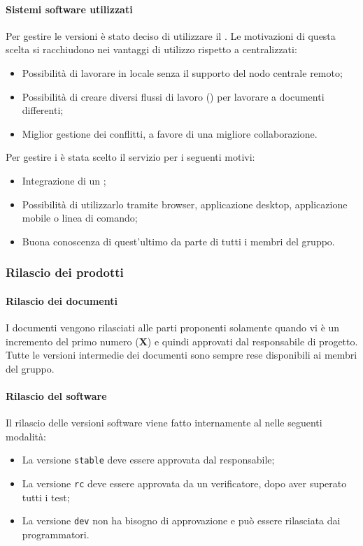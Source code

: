 \paragraph{Sistemi software utilizzati}
Per gestire le versioni è stato deciso di utilizzare il  . 
Le motivazioni di questa scelta si racchiudono nei vantaggi di utilizzo rispetto a  centralizzati:
\begin{itemize}
	\item Possibilità di lavorare in locale senza il supporto del nodo centrale remoto; 
	\item Possibilità di creare diversi flussi di lavoro () per lavorare a documenti differenti;
	\item Miglior gestione dei conflitti, a favore di una migliore collaborazione.
\end{itemize}
Per gestire i   è stata scelto il servizio  per i seguenti motivi: 
\begin{itemize}
	\item Integrazione di un ;
	\item Possibilità di utilizzarlo tramite browser, applicazione desktop, applicazione mobile o linea di comando;
	\item Buona conoscenza di quest'ultimo da parte di tutti i membri del gruppo.
\end{itemize}

\subsubsection{Rilascio dei prodotti}
\paragraph{Rilascio dei documenti}
I documenti vengono rilasciati alle parti proponenti solamente quando vi è un incremento del primo numero (\textbf{X}) e quindi approvati dal responsabile di progetto. Tutte le versioni intermedie dei documenti sono sempre rese disponibili ai membri del gruppo.

\paragraph{Rilascio del software}
Il rilascio delle versioni software viene fatto internamente al  nelle seguenti modalità:
\begin{itemize}
	\item La versione \texttt{stable} deve essere approvata dal responsabile;
	\item La versione \texttt{rc} deve essere approvata da un verificatore, dopo aver superato tutti i test;
	\item La versione \texttt{dev} non ha bisogno di approvazione e può essere rilasciata dai programmatori.
\end{itemize}

